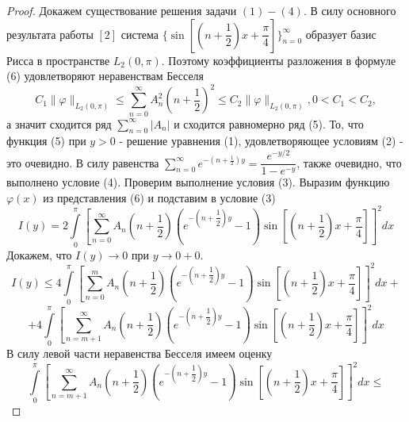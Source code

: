 \documentclass[a4paper, 11pt]{article}
\begin{document}
\begin{proof}
   
	
	Докажем существование решения задачи $(1) - (4)$. В силу основного результата работы $[2]$ система $\{\sin{\left[\left(n + \dfrac12\right)x + \dfrac\pi4\right]}\}_{n=0}^{\infty}$ образует базис Рисса в пространстве $L_2(0, \pi)$. Поэтому коэффициенты разложения в формуле (6) удовлетворяют неравенствам Бесселя
	\begin{equation*}
		C_1 \|\varphi \|_{L_2(0,\pi)} \leq \sum\limits_{n=0}^{\infty} A_n^2 \left(n + \dfrac12\right)^2 \leq C_2 \|\varphi \|_{L_2(0,\pi)} , 0 < C_1 < C_2, 
	\end{equation*}
а значит сходится ряд $\sum\limits_{n=0}^{\infty} |A_n|$ и сходится равномерно ряд (5). То, что функция (5) при $y > 0$ - решение уравнения (1), удовлетворяющее условиям (2) - это очевидно. В силу равенства $\sum\limits_{n=0}^{\infty} e^{-\left(n + \frac12\right)y} = \dfrac{e^{-y/2}}{1 - e^{-y}}$, также очевидно, что выполнено условие (4). Проверим выполнение условия (3).\newline
Выразим функцию $\varphi(x)$ из представления (6) и подставим в условие (3)
\begin{equation*}
	I(y) =  2 \int\limits_0^\pi \left[	\sum\limits_{n=0}^{\infty} A_n\left(n+\dfrac12\right) \left( e^{-\left(n+\dfrac12\right)y} - 1\right) \sin{\left[\left(n+\dfrac12\right) x  + \dfrac\pi4\right]} \right]^2 dx
\end{equation*}
Докажем, что $I(y) \to 0$ при $y \to 0+0$. 
\begin{equation*}
	I(y) \leq 4\int\limits_0^\pi \left[	\sum\limits_{n=0}^{m} A_n\left(n+\dfrac12\right) \left( e^{-\left(n+\dfrac12\right)y} - 1\right) \sin{\left[\left(n+\dfrac12\right) x  + \dfrac\pi4\right]} \right]^2 dx + 
\end{equation*}
\begin{equation*}
	+ 4\int\limits_0^\pi \left[	\sum\limits_{n=m+1}^{\infty} A_n\left(n+\dfrac12\right) \left( e^{-\left(n+\dfrac12\right)y} - 1\right) \sin{\left[\left(n+\dfrac12\right) x  + \dfrac\pi4\right]} \right]^2 dx
\end{equation*}
В силу левой части неравенства Бесселя имеем оценку
\begin{equation*}
	\int\limits_0^\pi \left[	\sum\limits_{n=m+1}^{\infty} A_n\left(n+\dfrac12\right) \left( e^{-\left(n+\dfrac12\right)y} - 1\right) \sin{\left[\left(n+\dfrac12\right) x  + \dfrac\pi4\right]} \right]^2 dx \leq 
\end{equation*}
\begin{equation*}

\end{equation*}
\end{proof}
\end{document}
